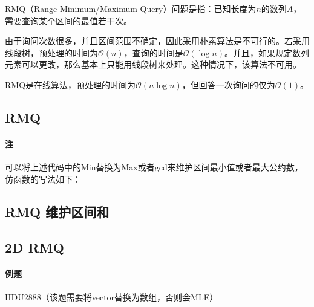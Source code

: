 RMQ（Range Minimum/Maximum Query）问题是指：已知长度为$n$的数列$A$，需要查询某个区间的最值若干次。

由于询问次数很多，并且区间范围不确定，因此采用朴素算法是不可行的。若采用线段树，预处理的时间为$\mathcal{O}(n)$，查询的时间是$\mathcal{O}(\log n)$。并且，如果规定数列元素可以更改，那么基本上只能用线段树来处理。这种情况下，该算法不可用。

RMQ是在线算法，预处理的时间为$\mathcal{O}(n\log n)$，但回答一次询问的仅为$\mathcal{O}(1)$。

\subsection{RMQ}



\paragraph{注} 可以将上述代码中的Min替换为Max或者gcd来维护区间最小值或者最大公约数，仿函数的写法如下：



\subsection{RMQ 维护区间和}


\subsection{2D RMQ}

\paragraph{例题} HDU2888（该题需要将vector替换为数组，否则会MLE）


